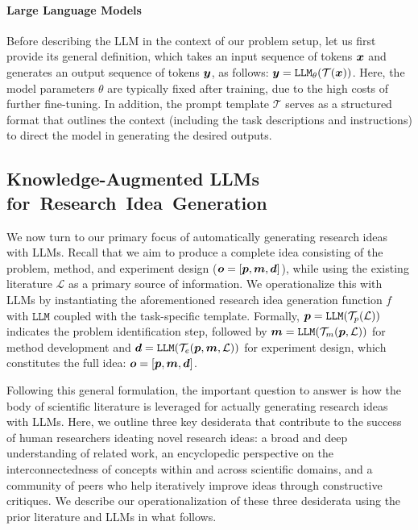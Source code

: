 \paragraph{Large Language Models}
Before describing the LLM in the context of our problem setup, let us first provide its general definition, which takes an input sequence of tokens ${\bm{x}}$ and generates an output sequence of tokens ${\bm{y}}$, as follows: ${\bm{y}} = \texttt{LLM}_{\theta}(\mathcal{T}({\bm{x}}))$. Here, the model parameters $\theta$ are typically fixed after training, due to the high costs of further fine-tuning. In addition, the prompt template $\mathcal{T}$ serves as a structured format that outlines the context (including the task descriptions and instructions) to direct the model in generating the desired outputs.


\subsection{Knowledge-Augmented LLMs for~Research~Idea~Generation}
We now turn to our primary focus of automatically generating research ideas with LLMs. Recall that we aim to produce a complete idea consisting of the problem, method, and experiment design (${\bm{o}} = [{\bm{p}}, {\bm{m}}, {\bm{d}}]$), while using the existing literature $\mathcal{L}$ as a primary source of information. We operationalize this with LLMs by instantiating the aforementioned research idea generation function $f$ with $\texttt{LLM}$ coupled with the task-specific template. Formally, ${\bm{p}} = \texttt{LLM}(\mathcal{T}_p(\mathcal{L}))$ indicates the problem identification step, followed by ${\bm{m}} = \texttt{LLM}(\mathcal{T}_m({\bm{p}}, \mathcal{L}))$ for method development and ${\bm{d}} = \texttt{LLM}(\mathcal{T}_e({\bm{p}}, {\bm{m}}, \mathcal{L}))$ for experiment design, which constitutes the full idea: ${\bm{o}} = [{\bm{p}}, {\bm{m}}, {\bm{d}}]$. 

Following this general formulation, the important question to answer is how the body of scientific literature is leveraged for actually generating research ideas with LLMs. 
Here, we outline three key desiderata that contribute to the success of human researchers ideating novel research ideas: a broad and deep understanding of related work, an encyclopedic perspective on the interconnectedness of concepts within and across scientific domains, and a community of peers who help iteratively improve ideas through constructive critiques. We describe our operationalization of these three desiderata using the prior literature and LLMs in what follows.


